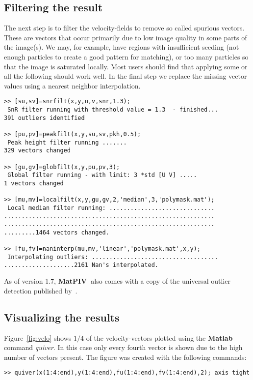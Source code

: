 \documentclass{book}
\newcommand{\matpiv}{{\bf MatPIV~}}
\begin{document}
\subsection{Filtering the result}

The next step is to filter the velocity-fields to remove so called
spurious vectors. These are vectors that occur primarily due to low
image quality in some parts of the image(s). We may, for example, have
regions with insufficient seeding (not enough particles to create a good
pattern for matching), or too many particles so that the image is
saturated locally. Most users should find that applying some or all the
following should work well. In the final step we replace the missing
vector values using a nearest neighbor interpolation.

\begin{verbatim}
>> [su,sv]=snrfilt(x,y,u,v,snr,1.3);
 SnR filter running with threshold value = 1.3  - finished... 
391 outliers identified

>> [pu,pv]=peakfilt(x,y,su,sv,pkh,0.5);
 Peak height filter running ....... 
329 vectors changed 

>> [gu,gv]=globfilt(x,y,pu,pv,3);
 Global filter running - with limit: 3 *std [U V] ..... 
1 vectors changed

>> [mu,mv]=localfilt(x,y,gu,gv,2,'median',3,'polymask.mat');
 Local median filter running: ..............................
............................................................
............................................................
.........1464 vectors changed.

>> [fu,fv]=naninterp(mu,mv,'linear','polymask.mat',x,y);
 Interpolating outliers: ....................................
....................2161 Nan's interpolated.
\end{verbatim}

As of version 1.7, \matpiv also comes with a copy of the universal outlier detection published by~\cite{Westerweel2005}.

\subsection{Visualizing the results}
Figure~\ref{fig:velo} shows $1/4$ of the velocity-vectors plotted using
the {\bf Matlab} command {\em quiver}. In this case only every fourth
vector is shown due to the high number of vectors present. The figure
was created with the following commands:
\begin{verbatim}
>> quiver(x(1:4:end),y(1:4:end),fu(1:4:end),fv(1:4:end),2); axis tight
\end{verbatim}
\end{document}
